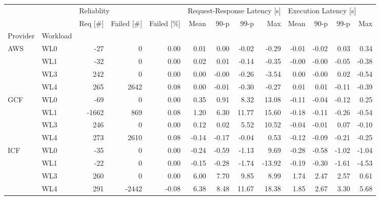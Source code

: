 \begin{tabular}{llrrrrrrrrrrr}
\toprule
    &     & \multicolumn{3}{l}{Reliablity} & \multicolumn{4}{l}{Request-Response Latency [s]} & \multicolumn{4}{l}{Execution Latency [s]} \\
    &     &    Req [\#] & Failed [\#] & Failed [\%] &                         Mean &  90-p &  99-p &    Max &                  Mean &  90-p &  99-p &   Max \\
Provider & Workload &            &            &            &                              &       &       &        &                       &       &       &       \\
\midrule
AWS & WL0 &        -27 &          0 &       0.00 &                         0.01 &  0.00 & -0.02 &  -0.29 &                 -0.01 & -0.02 &  0.03 &  0.34 \\
    & WL1 &        -32 &          0 &       0.00 &                         0.02 &  0.01 & -0.14 &  -0.35 &                 -0.00 & -0.00 & -0.05 & -0.38 \\
    & WL3 &        242 &          0 &       0.00 &                         0.00 & -0.00 & -0.26 &  -3.54 &                  0.00 & -0.00 &  0.02 & -0.54 \\
    & WL4 &        265 &       2642 &       0.08 &                         0.00 & -0.01 & -0.30 &  -0.27 &                  0.01 &  0.01 & -0.11 & -0.39 \\
GCF & WL0 &        -69 &          0 &       0.00 &                         0.35 &  0.91 &  8.32 &  13.08 &                 -0.11 & -0.04 & -0.12 &  0.25 \\
    & WL1 &      -1662 &        869 &       0.08 &                         1.20 &  6.30 & 11.77 &  15.60 &                 -0.18 & -0.11 & -0.26 & -0.54 \\
    & WL3 &        246 &          0 &       0.00 &                         0.12 &  0.02 &  5.52 &  10.52 &                 -0.04 & -0.01 &  0.07 & -0.10 \\
    & WL4 &        273 &       2610 &       0.08 &                        -0.14 & -0.17 & -0.04 &   0.53 &                 -0.12 & -0.09 & -0.21 & -0.25 \\
ICF & WL0 &        -35 &          0 &       0.00 &                        -0.24 & -0.59 & -1.13 &   9.69 &                 -0.28 & -0.58 & -1.02 & -1.04 \\
    & WL1 &        -22 &          0 &       0.00 &                        -0.15 & -0.28 & -1.74 & -13.92 &                 -0.19 & -0.30 & -1.61 & -4.53 \\
    & WL3 &        260 &          0 &       0.00 &                         6.00 &  7.70 &  9.85 &   8.99 &                  1.74 &  2.47 &  2.57 &  0.61 \\
    & WL4 &        291 &      -2442 &      -0.08 &                         6.38 &  8.48 & 11.67 &  18.38 &                  1.85 &  2.67 &  3.30 &  5.68 \\
\bottomrule
\end{tabular}
